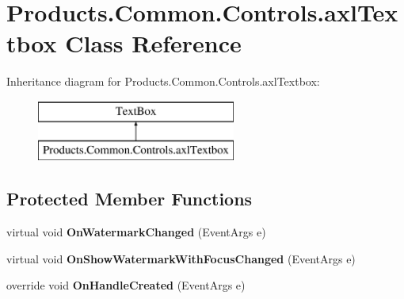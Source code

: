 \hypertarget{class_products_1_1_common_1_1_controls_1_1axl_textbox}{}\section{Products.\+Common.\+Controls.\+axl\+Textbox Class Reference}
\label{class_products_1_1_common_1_1_controls_1_1axl_textbox}
Inheritance diagram for Products.\+Common.\+Controls.\+axl\+Textbox\+:\begin{figure}[H]
\begin{center}
\leavevmode
\includegraphics[height=2.000000cm]{class_products_1_1_common_1_1_controls_1_1axl_textbox}
\end{center}
\end{figure}
\subsection*{Protected Member Functions}
\begin{DoxyCompactItemize}
\item 
virtual void {\bfseries On\+Watermark\+Changed} (Event\+Args e)\hypertarget{class_products_1_1_common_1_1_controls_1_1axl_textbox_adc506561b9f3571cc6e1cb4609c59b96}{}\label{class_products_1_1_common_1_1_controls_1_1axl_textbox_adc506561b9f3571cc6e1cb4609c59b96}

\item 
virtual void {\bfseries On\+Show\+Watermark\+With\+Focus\+Changed} (Event\+Args e)\hypertarget{class_products_1_1_common_1_1_controls_1_1axl_textbox_ad4e0452b3d57b7073ed824ffa2ac452e}{}\label{class_products_1_1_common_1_1_controls_1_1axl_textbox_ad4e0452b3d57b7073ed824ffa2ac452e}

\item 
override void {\bfseries On\+Handle\+Created} (Event\+Args e)\hypertarget{class_products_1_1_common_1_1_controls_1_1axl_textbox_adf250da211c24b72a36624ab99ae1025}{}\label{class_products_1_1_common_1_1_controls_1_1axl_textbox_adf250da211c24b72a36624ab99ae1025}

\end{DoxyCompactItemize}
